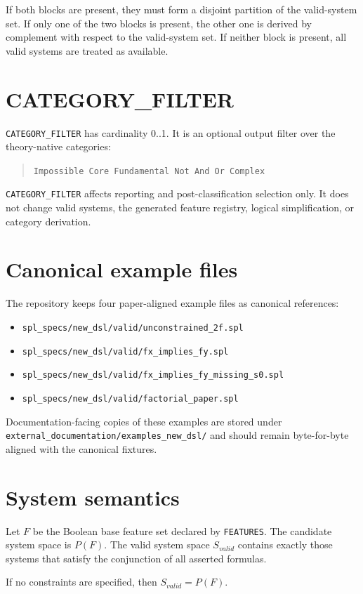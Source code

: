 \documentclass[english,10pt,a4paper,draft,onecolumn]{article}
\begin{document}
If both blocks are present, they must form a disjoint partition of the valid-system set. If only one of the two blocks is present, the other one is derived by complement with respect to the valid-system set. If neither block is present, all valid systems are treated as available.

\section{CATEGORY\_FILTER}
\texttt{CATEGORY\_FILTER} has cardinality 0..1. It is an optional output filter over the theory-native categories:
\begin{quote}
\texttt{Impossible Core Fundamental Not And Or Complex}
\end{quote}

\texttt{CATEGORY\_FILTER} affects reporting and post-classification selection only. It does not change valid systems, the generated feature registry, logical simplification, or category derivation.

\section{Canonical example files}
The repository keeps four paper-aligned example files as canonical references:
\begin{itemize}[leftmargin=*]
\item \texttt{spl\_specs/new\_dsl/valid/unconstrained\_2f.spl}
\item \texttt{spl\_specs/new\_dsl/valid/fx\_implies\_fy.spl}
\item \texttt{spl\_specs/new\_dsl/valid/fx\_implies\_fy\_missing\_s0.spl}
\item \texttt{spl\_specs/new\_dsl/valid/factorial\_paper.spl}
\end{itemize}
Documentation-facing copies of these examples are stored under
\texttt{external\_documentation/examples\_new\_dsl/} and should remain byte-for-byte aligned with the canonical fixtures.

\section{System semantics}
Let \(F\) be the Boolean base feature set declared by \texttt{FEATURES}. The candidate system space is \(P(F)\). The valid system space \(S_{valid}\) contains exactly those systems that satisfy the conjunction of all asserted formulas.

If no constraints are specified, then \(S_{valid} = P(F)\).
\end{document}
